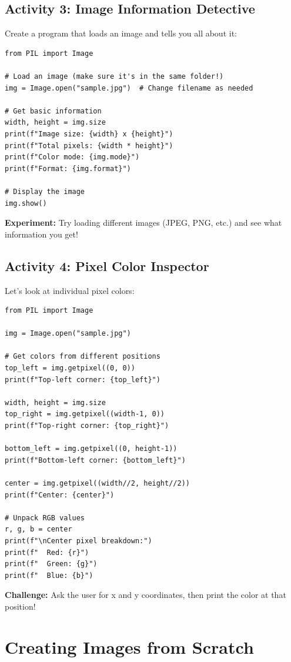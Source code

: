 \documentclass[11pt]{article}
\begin{document}
\subsection*{Activity 3: Image Information Detective}

Create a program that loads an image and tells you all about it:

\begin{lstlisting}
from PIL import Image

# Load an image (make sure it's in the same folder!)
img = Image.open("sample.jpg")  # Change filename as needed

# Get basic information
width, height = img.size
print(f"Image size: {width} x {height}")
print(f"Total pixels: {width * height}")
print(f"Color mode: {img.mode}")
print(f"Format: {img.format}")

# Display the image
img.show()
\end{lstlisting}

\textbf{Experiment:} Try loading different images (JPEG, PNG, etc.) and see what information you get!

\subsection*{Activity 4: Pixel Color Inspector}

Let's look at individual pixel colors:

\begin{lstlisting}
from PIL import Image

img = Image.open("sample.jpg")

# Get colors from different positions
top_left = img.getpixel((0, 0))
print(f"Top-left corner: {top_left}")

width, height = img.size
top_right = img.getpixel((width-1, 0))
print(f"Top-right corner: {top_right}")

bottom_left = img.getpixel((0, height-1))
print(f"Bottom-left corner: {bottom_left}")

center = img.getpixel((width//2, height//2))
print(f"Center: {center}")

# Unpack RGB values
r, g, b = center
print(f"\nCenter pixel breakdown:")
print(f"  Red: {r}")
print(f"  Green: {g}")
print(f"  Blue: {b}")
\end{lstlisting}

\textbf{Challenge:} Ask the user for x and y coordinates, then print the color at that position!

\section{Creating Images from Scratch}
\end{document}
